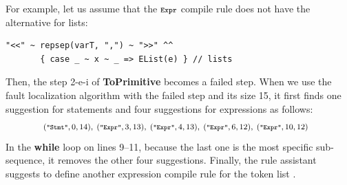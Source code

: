 For example, let us assume that the \( \texttt{\footnotesize Expr} \) compile rule
does not have the alternative for lists:
\begin{lstlisting}[style=myScalastyle]
  "<<" ~ repsep(varT, ",") ~ ">>" ^^
       { case _ ~ x ~ _ => EList(e) } // lists
\end{lstlisting}
Then, the step 2-e-i of \textbf{ToPrimitive} becomes a failed step.
When we use the fault localization algorithm with the failed step and
its size 15, it first finds one suggestion for statements and four
suggestions for expressions as follows:
\[
\footnotesize
\! \! \! \!
  \begin{array}{c}
    (\texttt{\scriptsize"Stmt"}, 0, 14), \;
    (\texttt{\scriptsize"Expr"}, 3, 13), \;
    (\texttt{\scriptsize"Expr"}, 4, 13), \;
    (\texttt{\scriptsize"Expr"}, 6, 12), \;
    (\texttt{\scriptsize"Expr"}, 10, 12)
  \end{array}
\]
In the \textbf{\small while} loop on lines 9--11, because the last one
is the most specific sub-sequence, it removes the other four
suggestions. Finally, the rule assistant suggests to define another
expression compile rule for the token list \hint{}.
